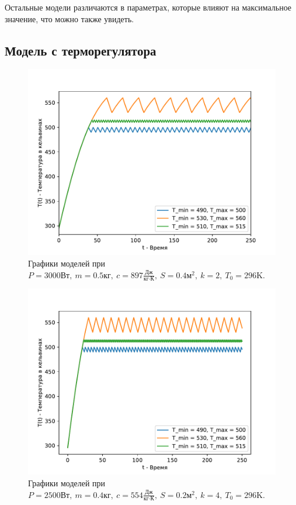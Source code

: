         Остальные модели различаются в параметрах, которые влияют на максимальное значение, что можно также увидеть.
    
    \subsection{Модель с терморегулятора}
        \begin{figure}[H]
            \centering
            \includegraphics[width=12cm]{pictures/utug2.pdf}
            \caption{Графики моделей при $P = 3000 \text{Вт}, ~ m = 0.5 \text{кг}, ~ c = 897 \frac{\text{Дж}}{\text{кг} \cdot \text{К}}, ~ S = 0.4 \text{м}^2, ~ k = 2, ~ T_0 = 296 \text{K}$.}
        \end{figure}


        \begin{figure}[H]
            \centering
            \includegraphics[width=12cm]{pictures/utug3.pdf}
            \caption{Графики моделей при $P = 2500 \text{Вт}, ~ m = 0.4 \text{кг}, ~ c = 554 \frac{\text{Дж}}{\text{кг} \cdot \text{К}}, ~ S = 0.2 \text{м}^2, ~ k = 4, ~ T_0 = 296 \text{K}$.}
        \end{figure}


